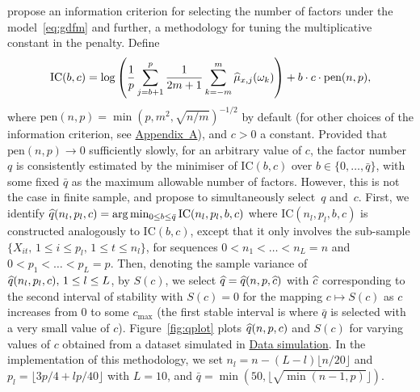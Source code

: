 \cite{hallin2007determining} propose an information criterion for selecting the number of factors under the model~\eqref{eq:gdfm} and further, a methodology for tuning the multiplicative constant in the penalty.
Define
\begin{align}
\label{eq:ic}
	\text{IC}(b, c) = \log \left(\frac{1}{p} \sum _{j = b + 1}^p \frac{1}{2m + 1} \sum_{k = -m}^m \widehat{\mu}_{x, j}(\omega_k) \right) 
 + b \cdot c \cdot \text{pen}(n, p),
\end{align}
where $\text{pen}(n, p) = \min(p, m^2, \sqrt{n / m})^{-1/2}$ by default (for other choices of the information criterion, see \hyperref[sec:factornumber]{Appendix~A}), and $c > 0$ a constant.
Provided that $\text{pen}(n, p) \to 0$ sufficiently slowly, for an arbitrary value of $c$, the factor number $q$ is consistently estimated by the minimiser of $\text{IC}(b, c)$ over $b \in \{0, \ldots, \bar{q}\}$, with some fixed $\bar{q}$ as the maximum allowable number of factors. 
However, this is not the case in finite sample, and \cite{hallin2007determining} propose to simultaneously select~$q$ and~$c$. 
First, we identify $\widehat q(n_l, p_l, c) = \arg\min_{0 \le b \le \bar{q}} \text{IC}(n_l, p_l, b, c)$ where $\text{IC}(n_l, p_l, b, c)$ is constructed analogously to $\text{IC}(b, c)$, except that it only involves the sub-sample $\{X_{it}, \, 1 \le i \le p_l, \, 1 \le t \le n_l\}$, for sequences $0 < n_1 < \ldots < n_L = n$ and $0 < p_1 < \ldots < p_L = p$.
Then, denoting the sample variance of $\widehat q(n_l, p_l, c), \, 1 \le l \le L$, by $S(c)$, we select $\widehat q = \widehat q(n, p, \widehat c)$ with $\widehat c$ corresponding to the second interval of stability with $S(c) = 0$ for the mapping $c \mapsto S(c)$ as $c$ increases from $0$ to some $c_{\max}$ (the first stable interval is where $\bar{q}$ is selected with a very small value of $c$).
Figure~\ref{fig:qplot} plots $\widehat q(n, p, c)$ and $S(c)$ for varying values of $c$ obtained from a dataset simulated in \hyperref[sec:package:data]{Data simulation}. 
In the implementation of this methodology, we set $n_l = n - (L - l) \lfloor n/20 \rfloor$ and $p_l = \lfloor 3p/4 + lp/40 \rfloor$ with $L = 10$, and $\bar{q} = \min(50, \lfloor \sqrt{\min(n - 1, p)} \rfloor)$.

